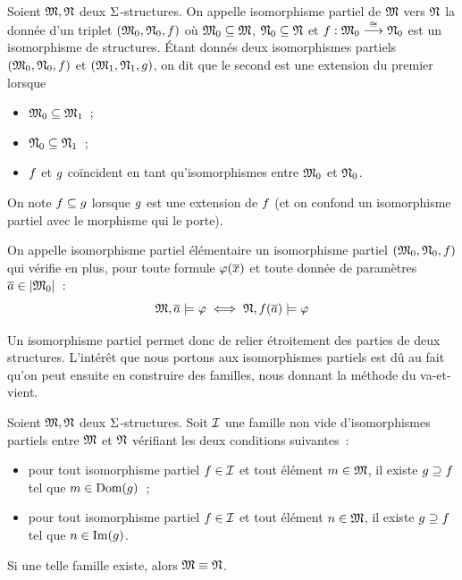 \begin{definition}
  Soient $\mathfrak{M},\mathfrak{N}$ deux $\Sigma$-structures. On appelle isomorphisme
  partiel de $\mathfrak{M}$ vers $\mathfrak{N}$ la donnée d'un triplet
  $(\mathfrak{M}_0,\mathfrak{N}_0,f)$ où $\mathfrak{M}_0\subseteq\mathfrak{M}$,
  $\mathfrak{N}_0\subseteq\mathfrak{N}$ et $f : \displaystyle \mathfrak{M}_0 \overset{\cong}{\longrightarrow} \mathfrak{N}_0$
  est un isomorphisme de structures. \'Etant donnés deux isomorphismes
  partiels $(\mathfrak{M}_0,\mathfrak{N}_0,f)$ et $(\mathfrak{M}_1,\mathfrak{N}_1,g)$,
  on dit que le second est une extension du premier lorsque
  \begin{itemize}
  \item $\mathfrak{M}_0\subseteq\mathfrak{M}_1$~;
  \item $\mathfrak{N}_0\subseteq\mathfrak{N}_1$~;
  \item $f$ et $g$ coïncident en tant qu'isomorphismes entre
    $\mathfrak{M}_0$ et $\mathfrak{N}_0$.
  \end{itemize}
  On note $f\subseteq g$ lorsque $g$ est une extension
  de $f$ (et on confond un isomorphisme partiel avec le morphisme qui le
  porte).

  On appelle isomorphisme partiel élémentaire un isomorphisme partiel
  $(\mathfrak{M}_0,\mathfrak{N}_0,f)$ qui vérifie en plus, pour toute formule
  $\varphi(\overline{x})$ et toute donnée de paramètres $\overline{a} \in \left\vert \mathfrak{M}_0\right\vert$~:
  \[\mathfrak{M},\overline{a} \models\varphi \iff \mathfrak{N},f(\overline{a})\models\varphi\]
\end{definition}

Un isomorphisme partiel permet donc de relier étroitement des parties de deux
structures. L'intérêt que nous portons aux isomorphismes partiels est dû au fait
qu'on peut ensuite en construire des familles, nous donnant la méthode du
va-et-vient.

\begin{theorem}[Va-et-vient]
  Soient $\mathfrak{M},\mathfrak{N}$ deux $\Sigma$-structures. Soit $\mathcal{I}$ une famille
  non vide d'isomorphismes partiels entre $\mathfrak{M}$ et $\mathfrak{N}$ vérifiant les
  deux conditions suivantes~:
  \begin{itemize}
  \item pour tout isomorphisme partiel $f \in\mathcal{I}$ et
    tout élément $m\in\mathfrak{M}$, il existe $g\supseteq f$ tel que
    $m\in\operatorname{Dom}(g)$~;
  \item pour tout isomorphisme partiel $f\in\mathcal{I}$ et
    tout élément $n\in\mathfrak{M}$, il existe $g\supseteq f$ tel que
    $n\in\operatorname{Im}(g)$.
  \end{itemize}
  Si une telle famille existe, alors $\mathfrak{M}\equiv\mathfrak{N}$.
\end{theorem}


